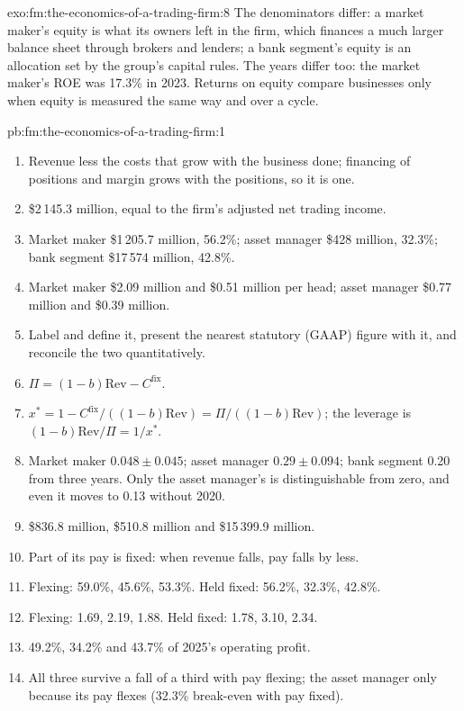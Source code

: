 \begin{solution}{exo:fm:the-economics-of-a-trading-firm:8}
The denominators differ: a market maker's equity is what its owners left in the firm, which finances a much larger balance sheet through brokers
and lenders; a bank segment's equity is an allocation set by the group's capital rules. The years differ too: the market maker's ROE was 17.3\% in
2023. Returns on equity compare businesses only when equity is measured the same way and over a cycle.
\end{solution}

\begin{solution}{pb:fm:the-economics-of-a-trading-firm:1}
\begin{enumerate}
\item Revenue less the costs that grow with the business done; financing of positions and margin grows with the positions, so it is one.
\item \$2\,145.3 million, equal to the firm's adjusted net trading income.
\item Market maker \$1\,205.7 million, 56.2\%; asset manager \$428 million, 32.3\%; bank segment \$17\,574 million, 42.8\%.
\item Market maker \$2.09 million and \$0.51 million per head; asset manager \$0.77 million and \$0.39 million.
\item Label and define it, present the nearest statutory (GAAP) figure with it, and reconcile the two quantitatively.
\item $\Pi=(1-b)\mathrm{Rev}-C^{\mathrm{fix}}$.
\item $x^\ast=1-C^{\mathrm{fix}}/((1-b)\mathrm{Rev})=\Pi/((1-b)\mathrm{Rev})$; the leverage is $(1-b)\mathrm{Rev}/\Pi=1/x^\ast$.
\item Market maker $0.048\pm0.045$; asset manager $0.29\pm0.094$; bank segment 0.20 from three years. Only the asset manager's is distinguishable
from zero, and even it moves to 0.13 without 2020.
\item \$836.8 million, \$510.8 million and \$15\,399.9 million.
\item Part of its pay is fixed: when revenue falls, pay falls by less.
\item Flexing: 59.0\%, 45.6\%, 53.3\%. Held fixed: 56.2\%, 32.3\%, 42.8\%.
\item Flexing: 1.69, 2.19, 1.88. Held fixed: 1.78, 3.10, 2.34.
\item 49.2\%, 34.2\% and 43.7\% of 2025's operating profit.
\item All three survive a fall of a third with pay flexing; the asset manager only because its pay flexes (32.3\% break-even with pay fixed).

\end{enumerate}
\end{solution}
